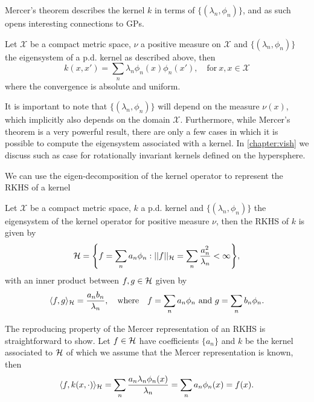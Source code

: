 Mercer's theorem describes the kernel $k$ in terms of $\{(\lambda_n, \phi_n)\}$, and as such opens interesting connections to GPs.
\begin{theorem}[Mercer]
  Let $\mathcal{X}$ be a compact metric space, $\nu$ a positive measure on $\mathcal{X}$ and $\{(\lambda_n, \phi_n)\}$ the eigensystem of a p.d. kernel as described above, then
\begin{equation}
  \label{eq:mercer}
  k(x,x')  = \sum_n \lambda_n \phi_n(x) \phi_n(x'),\quad\text{for}\ x,x\in \mathcal{X}
\end{equation}
where the convergence is absolute and uniform.
\end{theorem}
It is important to note that $\{(\lambda_n, \phi_n)\}$ will depend on the measure $\nu(x)$, which implicitly also depends on the domain $\mathcal{X}$. Furthermore, while Mercer's theorem is a very powerful result, there are only a few cases in which it is possible to compute the eigensystem associated with a kernel. In \cref{chapter:vish} we discuss such as case for rotationally invariant kernels defined on the hypersphere.

We can use the eigen-decomposition of the kernel operator to represent the RKHS of a kernel
\begin{theorem}
  Let $\mathcal{X}$ be a compact metric space, $k$ a p.d. kernel and $\{(\lambda_n, \phi_n)\}$ the eigensystem of the kernel operator for positive measure $\nu$, then the RKHS of $k$ is given by
\begin{equation}
    \label{eq:mercer-rkhs}
    \rkhs = \left\{
    f = \sum_n a_n \phi_{n}:
    \norm{f}_{\rkhs} = \sum_n \frac{a_n^2}{\lambda_n} < \infty
    \right\},
\end{equation}
with an inner product between $f,g \in {\mathcal{H}}$ given by
\begin{equation}
  \langle f, g \rangle_{\rkhs} = \frac{a_n b_n}{\lambda_n},\quad\text{where}\quad f = \sum_n a_n \phi_n\ \text{and}\ g = \sum_n b_n \phi_n.
\end{equation}
\end{theorem}
The reproducing property of the Mercer representation of an RKHS is straightforward to show. Let $f \in {\mathcal{H}}$ have coefficients $\{a_n\}$ and $k$ be the kernel associated to ${\mathcal{H}}$ of which we assume that the Mercer representation is known, then
\begin{equation}
  \langle f, k(x, \cdot) \rangle_{{\mathcal{H}}} = \sum_n \frac{a_n \lambda_n \phi_n(x)}{\lambda_n} = \sum_n a_n \phi_n(x) = f(x).
\end{equation}

